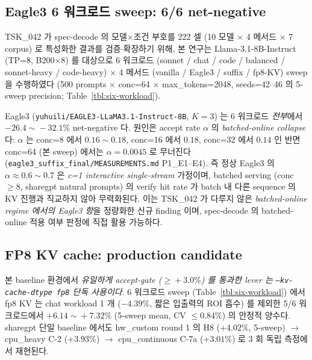 \subsection{Eagle3 6 워크로드 sweep: 6/6 net-negative}
\label{subsec:res-eagle3}



TSK\_042 가 spec-decode 의 모델$\times$조건 부호를 222 셀 (10 모델 $\times$ 4 메서드 $\times$ 7 corpus)
로 특성화한 결과를 검증$\cdot$확장하기 위해, 본 연구는 Llama-3.1-8B-Instruct (TP=8, B200$\times$8)
를 대상으로 6 워크로드 (sonnet / chat / code / balanced / sonnet-heavy / code-heavy)
$\times$ 4 메서드 (vanilla / Eagle3 / suffix / fp8-KV) sweep 을 수행하였다
(500 prompts $\times$ conc=64 $\times$ max\_tokens=2048, seeds=42--46 의 5-sweep precision; Table~\ref{tbl:six-workload}).

Eagle3 (\texttt{yuhuili/EAGLE3-LLaMA3.1-Instruct-8B}, $K\!=\!3$) 는 6 워크로드 \emph{전부}에서
$-26.4\!\sim\!-32.1\%$ net-negative 다.
원인은 accept rate $\alpha$ 의 \emph{batched-online collapse} 다:
$\alpha$ 는 conc=8 에서 $0.16\!\sim\!0.18$, conc=16 에서 $0.18$, conc=32 에서 $0.14$ 인 반면
conc=64 (본 sweep) 에서는 $\alpha\!=\!0.0045$ 로 무너진다 (\texttt{eagle3\_suffix\_final/MEASUREMENTS.md} P1\_E1--E4).
즉 정상 Eagle3 의 $\alpha\!\approx\!0.6\!\sim\!0.7$ 은 \emph{c=1 interactive single-stream} 가정이며,
batched serving (conc$\ge\!8$, sharegpt natural prompts) 의 verify hit rate 가
batch 내 다른 sequence 의 KV 진행과 직교하지 않아 무력화된다.
이는 TSK\_042 가 다루지 않은 \emph{batched-online regime 에서의 Eagle3 항}을 정량화한 신규 finding 이며,
spec-decode 의 batched-online 적용 여부 판정에 직접 활용 가능하다.

\subsection{FP8 KV cache: production candidate}
\label{subsec:res-fp8}

본 baseline 환경에서 \emph{유일하게 accept-gate ($\ge\!+3.0\%$) 를 통과한 lever 는
\texttt{--kv-cache-dtype fp8} 단독 사용이다}.
6 워크로드 sweep (Table~\ref{tbl:six-workload}) 에서 fp8 KV 는 chat workload 1 개 ($-4.39\%$, 짧은 입출력의 ROI 흡수)
를 제외한 5/6 워크로드에서 $+6.14\!\sim\!+7.32\%$ (5-sweep mean, CV $\le0.84\%$) 의 안정적 양수다.
sharegpt 단일 baseline 에서도 hw\_custom round 1 의 H8 ($+4.02\%$, 5-sweep)
$\to$ cpu\_heavy C-2 ($+3.93\%$) $\to$ cpu\_continuous C-7a ($+3.01\%$) 로
3 회 독립 측정에서 재현된다.

